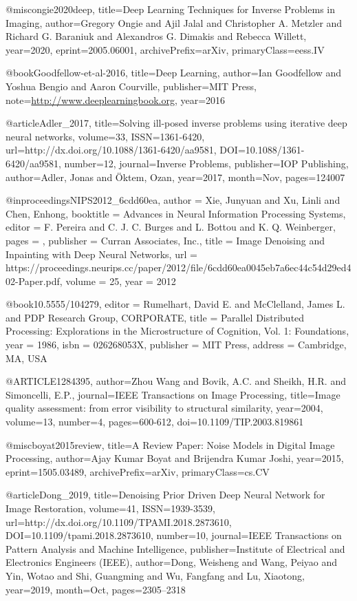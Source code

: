 @misc{ongie2020deep,
      title={Deep Learning Techniques for Inverse Problems in Imaging}, 
      author={Gregory Ongie and Ajil Jalal and Christopher A. Metzler and Richard G. Baraniuk and Alexandros G. Dimakis and Rebecca Willett},
      year={2020},
      eprint={2005.06001},
      archivePrefix={arXiv},
      primaryClass={eess.IV}
}

@book{Goodfellow-et-al-2016,
    title={Deep Learning},
    author={Ian Goodfellow and Yoshua Bengio and Aaron Courville},
    publisher={MIT Press},
    note={\url{http://www.deeplearningbook.org}},
    year={2016}
}

@article{Adler_2017,
	title={Solving ill-posed inverse problems using iterative deep neural networks},
	volume={33},
	ISSN={1361-6420},
	url={http://dx.doi.org/10.1088/1361-6420/aa9581},
	DOI={10.1088/1361-6420/aa9581},
	number={12},
	journal={Inverse Problems},
	publisher={IOP Publishing},
	author={Adler, Jonas and Öktem, Ozan},
	year={2017},
	month={Nov},
	pages={124007}
}

@inproceedings{NIPS2012_6cdd60ea,
	author = {Xie, Junyuan and Xu, Linli and Chen, Enhong},
	booktitle = {Advances in Neural Information Processing Systems},
	editor = {F. Pereira and C. J. C. Burges and L. Bottou and K. Q. Weinberger},
	pages = {},
	publisher = {Curran Associates, Inc.},
	title = {Image Denoising and Inpainting with Deep Neural Networks},
	url = {https://proceedings.neurips.cc/paper/2012/file/6cdd60ea0045eb7a6ec44c54d29ed402-Paper.pdf},
	volume = {25},
	year = {2012}
}

@book{10.5555/104279,
	editor = {Rumelhart, David E. and McClelland, James L. and PDP Research Group, CORPORATE},
	title = {Parallel Distributed Processing: Explorations in the Microstructure of Cognition, Vol. 1: Foundations},
	year = {1986},
	isbn = {026268053X},
	publisher = {MIT Press},
	address = {Cambridge, MA, USA}
}

@ARTICLE{1284395,
	author={Zhou Wang and Bovik, A.C. and Sheikh, H.R. and Simoncelli, E.P.},
	journal={IEEE Transactions on Image Processing}, 
	title={Image quality assessment: from error visibility to structural similarity}, 
	year={2004},
	volume={13},
	number={4},
	pages={600-612},
	doi={10.1109/TIP.2003.819861}}

@misc{boyat2015review,
	title={A Review Paper: Noise Models in Digital Image Processing}, 
	author={Ajay Kumar Boyat and Brijendra Kumar Joshi},
	year={2015},
	eprint={1505.03489},
	archivePrefix={arXiv},
	primaryClass={cs.CV}
}

@article{Dong_2019,
	title={Denoising Prior Driven Deep Neural Network for Image Restoration},
	volume={41},
	ISSN={1939-3539},
	url={http://dx.doi.org/10.1109/TPAMI.2018.2873610},
	DOI={10.1109/tpami.2018.2873610},
	number={10},
	journal={IEEE Transactions on Pattern Analysis and Machine Intelligence},
	publisher={Institute of Electrical and Electronics Engineers (IEEE)},
	author={Dong, Weisheng and Wang, Peiyao and Yin, Wotao and Shi, Guangming and Wu, Fangfang and Lu, Xiaotong},
	year={2019},
	month={Oct},
	pages={2305–2318}
}

